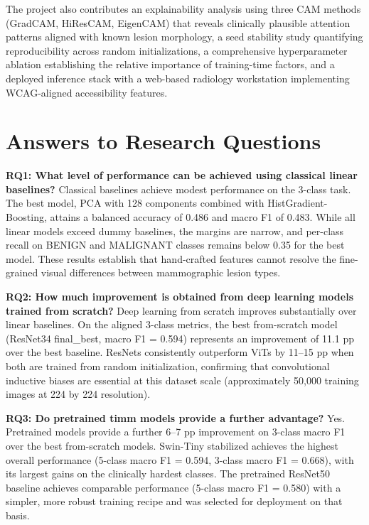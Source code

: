 \documentclass[justified,notoc,openany]{tufte-book}
\begin{document}
The project also contributes an explainability analysis using three CAM methods (GradCAM, HiResCAM, EigenCAM) that reveals clinically plausible attention patterns aligned with known lesion morphology, a seed stability study quantifying reproducibility across random initializations, a comprehensive hyperparameter ablation establishing the relative importance of training-time factors, and a deployed inference stack with a web-based radiology workstation implementing WCAG-aligned accessibility features.

\section{Answers to Research Questions}\label{answers-to-research-questions}

\textbf{RQ1: What level of performance can be achieved using classical linear baselines?} Classical baselines achieve modest performance on the 3-class task. The best model, PCA with 128 components combined with HistGradient-Boosting, attains a balanced accuracy of 0.486 and macro F1 of 0.483. While all linear models exceed dummy baselines, the margins are narrow, and per-class recall on BENIGN and MALIGNANT classes remains below 0.35 for the best model. These results establish that hand-crafted features cannot resolve the fine-grained visual differences between mammographic lesion types.

\textbf{RQ2: How much improvement is obtained from deep learning models trained from scratch?} Deep learning from scratch improves substantially over linear baselines. On the aligned 3-class metrics, the best from-scratch model (ResNet34 final\_best, macro F1 = 0.594) represents an improvement of 11.1 pp over the best baseline. ResNets consistently outperform ViTs by 11--15 pp when both are trained from random initialization, confirming that convolutional inductive biases are essential at this dataset scale (approximately 50,000 training images at 224 by 224 resolution).

\textbf{RQ3: Do pretrained timm models provide a further advantage?} Yes. Pretrained models provide a further 6--7 pp improvement on 3-class macro F1 over the best from-scratch models. Swin-Tiny stabilized achieves the highest overall performance (5-class macro F1 = 0.594, 3-class macro F1 = 0.668), with its largest gains on the clinically hardest classes. The pretrained ResNet50 baseline achieves comparable performance (5-class macro F1 = 0.580) with a simpler, more robust training recipe and was selected for deployment on that basis.
\end{document}
